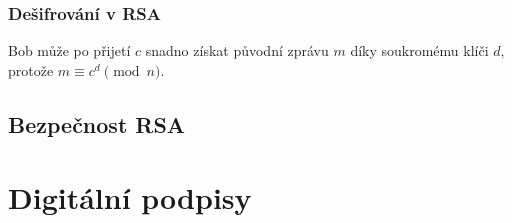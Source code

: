 \documentclass[
  program=infoi,
  biblatex,
  figures=false,
  glossaries,
  index
]{kidiplom}
\begin{document}
        \subsubsection{Dešifrování v RSA}
            Bob může po přijetí $c$ snadno získat původní zprávu $m$ díky soukromému klíči $d$, protože $m \equiv c^d \pmod{n}$.
            

    \subsection{Bezpečnost RSA}\label{sub:RSA-security}







\section{Digitální podpisy}\label{sec:digital-signatures}
\end{document}
